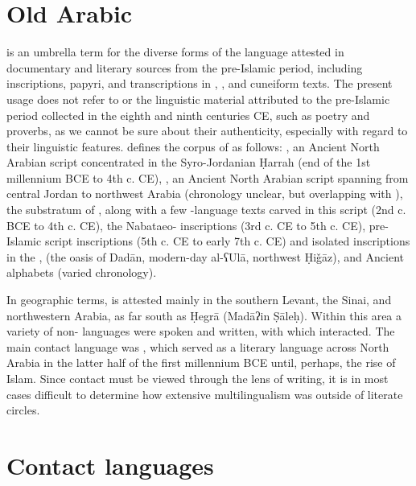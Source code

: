 \documentclass[output=paper]{langsci/langscibook}
\begin{document}
\section{Old Arabic}
  is an umbrella term for the diverse forms of the language attested in documentary and literary sources from the pre-Islamic period, including inscriptions, papyri, and transcriptions in , , and cuneiform texts. The present usage does not refer to   or the linguistic material attributed to the pre-Islamic period collected in the eighth and ninth centuries CE, such as poetry and proverbs, as we cannot be sure about their authenticity, especially with regard to their linguistic features. \citet{Al-Jallad2017early} defines the corpus of   as follows: , an Ancient North Arabian script concentrated in the Syro-Jordanian Ḥarrah (end of the 1st millennium BCE to 4th c. CE), , an Ancient North Arabian script spanning from central Jordan to northwest Arabia (chronology unclear, but overlapping with ), the substratum of , along with a few -language texts carved in this script (2nd c. BCE to 4th c. CE), the Nabataeo- inscriptions (3rd c. CE to 5th c. CE), pre-Islamic  script inscriptions (5th c. CE to early 7th c. CE) and isolated inscriptions in the ,  (the oasis of Dadān, modern-day al-ʕUlā, northwest Ḥiǧāz), and Ancient  alphabets (varied chronology). 

In geographic terms,   is attested mainly in the southern Levant, the Sinai, and northwestern Arabia, as far south as Ḥegrā (Madāʔin Ṣāleḥ). Within this area a variety of non- languages were spoken and written, with which   interacted. The main contact language was , which served as a literary language across North Arabia in the latter half of the first millennium BCE until, perhaps, the rise of Islam. Since contact must be viewed through the lens of writing, it is in most cases difficult to determine how extensive multilingualism was outside of literate circles.

\section{Contact languages}
\end{document}
